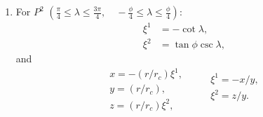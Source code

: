 \documentclass{report}
\begin{document}
\begin{enumerate}
\item For $P^2$ $\left(\frac{\pi}{4} \leq \lambda \leq  \frac{3\pi}{4}, \quad -\frac{\phi}{4} \leq \lambda \leq  \frac{\phi}{4} \right)$:
\begin{equation}
\begin{split} \label{eq:P2-sphere-to-cube}
        \xi^1 &= - \cot \lambda ,\\
        \xi^2 &= \tan \phi \csc \lambda ,
\end{split}
\end{equation}
and
\begin{equation}\label{eq:P2-cube-to-global-and-vice-versa}
    \begin{array}{l}
        x = -(r/r_c) \xi^1 , \\
        y = (r/r_c),\\
        z = (r/r_c) \xi^2,
    \end{array}
\qquad
    \begin{array}{l}
        \xi^1 = -{x}/{y}, \\
        \xi^2 =  {z}/{y} .\\
    \end{array}
\end{equation}

\end{enumerate}
\end{document}
